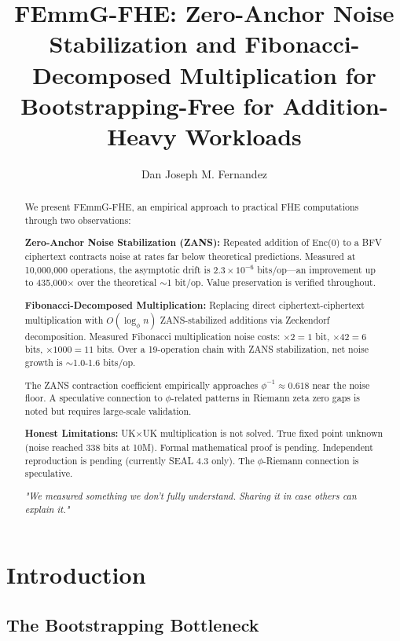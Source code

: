 \documentclass[11pt]{article}
\title{FEmmG-FHE: Zero-Anchor Noise Stabilization and Fibonacci-Decomposed 
       Multiplication for Bootstrapping-Free for Addition-Heavy Workloads}
\author{Dan Joseph M. Fernandez}
\affiliation{Primordial Omega Zero}
\begin{document}
\maketitle

\begin{abstract}
We present FEmmG-FHE, an empirical approach to practical FHE computations through two observations:

\vspace{0.2cm}
\textbf{Zero-Anchor Noise Stabilization (ZANS):} 
Repeated addition of Enc(0) to a BFV ciphertext contracts noise at rates far below theoretical predictions.
Measured at 10,000,000 operations, the asymptotic drift is $2.3 \times 10^{-6}$ bits/op—an improvement up to 435,000$\times$ over the theoretical $\sim$1 bit/op.
Value preservation is verified throughout.

\vspace{0.2cm}
\textbf{Fibonacci-Decomposed Multiplication:} 
Replacing direct ciphertext-ciphertext multiplication with $O(\log_\phi n)$ ZANS-stabilized additions via Zeckendorf decomposition.
Measured Fibonacci multiplication noise costs: $\times 2 = 1$ bit, $\times 42 = 6$ bits, $\times 1000 = 11$ bits.
Over a 19-operation chain with ZANS stabilization, net noise growth is $\sim$1.0-1.6 bits/op.

\vspace{0.2cm}
The ZANS contraction coefficient empirically approaches $\phi^{-1} \approx 0.618$ near the noise floor.
A speculative connection to $\phi$-related patterns in Riemann zeta zero gaps is noted but requires large-scale validation.

\vspace{0.2cm}
\textbf{Honest Limitations:}
UK$\times$UK multiplication is not solved.
True fixed point unknown (noise reached 338 bits at 10M).
Formal mathematical proof is pending.
Independent reproduction is pending (currently SEAL 4.3 only).
The $\phi$-Riemann connection is speculative.

\vspace{0.2cm}
\textit{"We measured something we don't fully understand. Sharing it in case others can explain it."}
\end{abstract}

\section{Introduction}

\subsection{The Bootstrapping Bottleneck}
\end{document}
